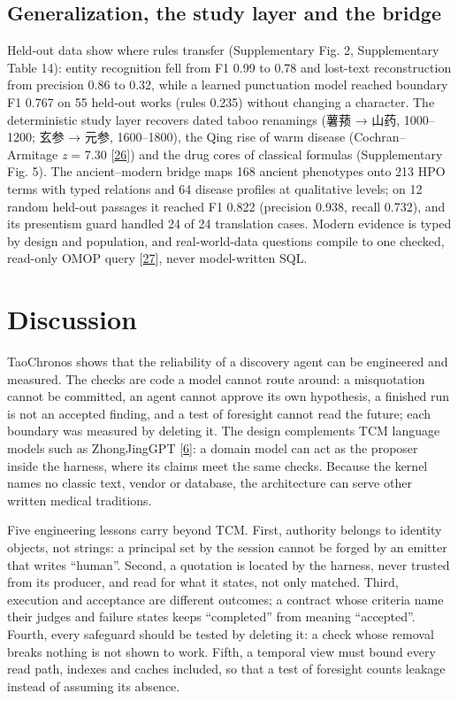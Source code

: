 \documentclass[
]{article}
\begin{document}
\hypertarget{generalization-the-study-layer-and-the-bridge}{%
\subsection{Generalization, the study layer and the
bridge}\label{generalization-the-study-layer-and-the-bridge}}

Held-out data show where rules transfer (Supplementary Fig. 2,
Supplementary Table 14): entity recognition fell from F1 0.99 to 0.78
and lost-text reconstruction from precision 0.86 to 0.32, while a
learned punctuation model reached boundary F1 0.767 on 55 held-out works
(rules 0.235) without changing a character. The deterministic study
layer recovers dated taboo renamings (薯蓣 → 山药, 1000--1200; 玄参 →
元参, 1600--1800), the Qing rise of warm disease (Cochran--Armitage
\emph{z} = 7.30 {[}\protect\hyperlink{ref-armitage1955tests}{26}{]}) and
the drug cores of classical formulas (Supplementary Fig. 5). The
ancient--modern bridge maps 168 ancient phenotypes onto 213 HPO terms
with typed relations and 64 disease profiles at qualitative levels; on
12 random held-out passages it reached F1 0.822 (precision 0.938, recall
0.732), and its presentism guard handled 24 of 24 translation cases.
Modern evidence is typed by design and population, and real-world-data
questions compile to one checked, read-only OMOP query
{[}\protect\hyperlink{ref-hripcsak2015ohdsi}{27}{]}, never model-written
SQL.

\hypertarget{discussion}{%
\section{Discussion}\label{discussion}}

TaoChronos shows that the reliability of a discovery agent can be
engineered and measured. The checks are code a model cannot route
around: a misquotation cannot be committed, an agent cannot approve its
own hypothesis, a finished run is not an accepted finding, and a test of
foresight cannot read the future; each boundary was measured by deleting
it. The design complements TCM language models such as ZhongJingGPT
{[}\protect\hyperlink{ref-kang2025zhongjinggpt}{6}{]}: a domain model
can act as the proposer inside the harness, where its claims meet the
same checks. Because the kernel names no classic text, vendor or
database, the architecture can serve other written medical traditions.

Five engineering lessons carry beyond TCM. First, authority belongs to
identity objects, not strings: a principal set by the session cannot be
forged by an emitter that writes ``human''. Second, a quotation is
located by the harness, never trusted from its producer, and read for
what it states, not only matched. Third, execution and acceptance are
different outcomes; a contract whose criteria name their judges and
failure states keeps ``completed'' from meaning ``accepted''. Fourth,
every safeguard should be tested by deleting it: a check whose removal
breaks nothing is not shown to work. Fifth, a temporal view must bound
every read path, indexes and caches included, so that a test of
foresight counts leakage instead of assuming its absence.
\end{document}
